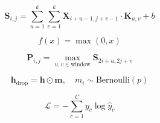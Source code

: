 
\begin{equation}
\mathbf{S}_{i,j} = \sum_{u=1}^{k} \sum_{v=1}^{k} \mathbf{X}_{i+u-1, j+v-1} \cdot \mathbf{K}_{u,v} + b
\end{equation}

\begin{equation}
f(x) = \max(0, x)
\end{equation}

\begin{equation}
\mathbf{P}_{i,j} = \max_{u,v \in \text{window}} \mathbf{S}_{2i+u, 2j+v}
\end{equation}

\begin{equation}
\mathbf{h}_{\text{drop}} = \mathbf{h} \odot \mathbf{m}, \quad m_i \sim \text{Bernoulli}(p)
\end{equation}

\begin{equation}
\mathcal{L} = -\sum_{c=1}^{C} y_c \log \hat{y}_c
\end{equation}